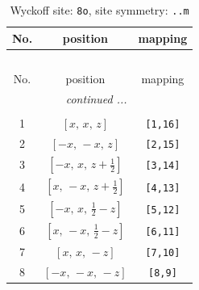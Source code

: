 \documentclass[fleqn,8pt]{jsarticle}
\begin{document}
\begin{longtable}{ccc}
\caption{Wyckoff site: {\tt 8o}, site symmetry: {\tt ..m}}
 \\
 \hline \hline
No. & position & mapping \\ \hline \endfirsthead

\multicolumn{2}{l}{\tablename\ \thetable{}} \\
 \hline \hline
No. & position & mapping \\ \hline \endhead

 \hline \hline
\multicolumn{2}{r}{\footnotesize\it continued ...} \\ \endfoot

 \hline \hline
\multicolumn{2}{r}{} \\ \endlastfoot

1 & $\left[ x,\, x,\, z \right]$ & {\tt [1,16]} \\ \hline
2 & $\left[ - x,\, - x,\, z \right]$ & {\tt [2,15]} \\ \hline
3 & $\left[ - x,\, x,\, z + \frac{1}{2} \right]$ & {\tt [3,14]} \\ \hline
4 & $\left[ x,\, - x,\, z + \frac{1}{2} \right]$ & {\tt [4,13]} \\ \hline
5 & $\left[ - x,\, x,\, \frac{1}{2} - z \right]$ & {\tt [5,12]} \\ \hline
6 & $\left[ x,\, - x,\, \frac{1}{2} - z \right]$ & {\tt [6,11]} \\ \hline
7 & $\left[ x,\, x,\, - z \right]$ & {\tt [7,10]} \\ \hline
8 & $\left[ - x,\, - x,\, - z \right]$ & {\tt [8,9]} \\
\end{longtable}
\renewcommand{\arraystretch}{1.2}
\end{document}
